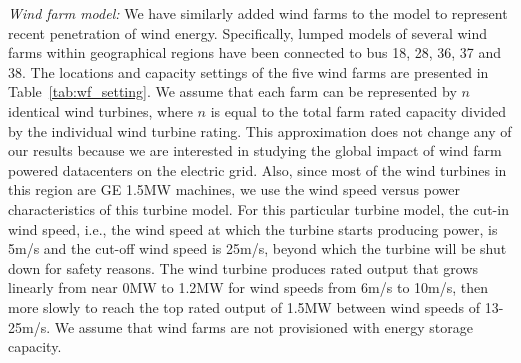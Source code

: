 {\em Wind farm model:}  We have similarly added wind farms to the model to represent recent penetration of wind energy.  Specifically, lumped models of several wind farms within geographical regions have been connected to bus 18, 28, 36, 37 and 38. 
The locations and capacity settings of the five wind farms are presented in Table~\ref{tab:wf_setting}. We assume that each farm can be represented by $n$ identical wind turbines, where $n$ is equal to the total farm rated capacity divided by the individual wind turbine rating. This approximation does not change any of our results because we are interested in studying the global impact of wind farm powered datacenters on the electric grid. Also, since most of the wind turbines in this region are GE 1.5MW machines, we use the 
wind speed versus power characteristics of this turbine model\cite{lei2006modeling}.
For this particular turbine model, the cut-in wind speed, i.e., the wind speed at which the turbine starts producing power, is 5m/s and the cut-off wind speed is 25m/s, beyond which the turbine will be shut down for safety reasons. The wind turbine produces rated output that grows linearly from near 0MW to 1.2MW for wind speeds from 6m/s to 10m/s, then more slowly to reach the top rated output of 1.5MW between wind speeds of 13-25m/s.  We assume that wind farms are not provisioned with energy storage capacity.




